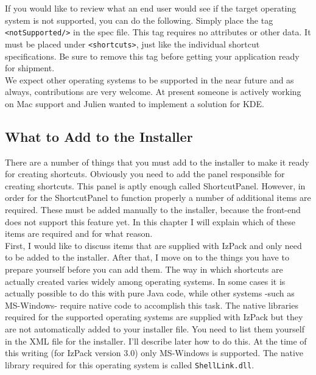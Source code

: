 If you would like to review what an end user would see if the target
operating system is not supported, you can do the following. Simply
place the tag \texttt{<notSupported/>} in the spec file. This tag requires no
attributes or other data. It must be placed under \texttt{<shortcuts>}, just like
the individual shortcut specifications. Be sure to remove this tag
before getting your application ready for shipment.\\

We expect other operating systems to be supported in the near future and
as always, contributions are very welcome. At present someone is
actively working on Mac support and  Julien wanted to implement a
solution for KDE.\\

\subsection{What to Add to the Installer}

There are a number of things that you must add to the installer to make
it ready for creating shortcuts. Obviously you need to add the panel
responsible for creating shortcuts. This panel is aptly enough called
ShortcutPanel. However, in order for the ShortcutPanel to function
properly a number of additional items are required. These must be added
manually to the installer, because the front-end does not support this
feature yet. In this chapter I will explain which of these items are
required and for what reason.\\

First, I would like to discuss items that are supplied with IzPack and
only need to be added to the installer. After that, I move on to the
things you have to prepare yourself before you can add them. The way in
which shortcuts are actually created varies widely among operating
systems. In some cases it is actually possible to do this with pure Java
code, while other systems -such as MS-Windows- require native code to
accomplish this task. The native libraries required for the supported
operating systems are supplied with IzPack but they are not
automatically added to your installer file. You need to list them
yourself in the XML file for the installer. I'll describe later how to
do this. At the time of this writing (for IzPack version 3.0) only
MS-Windows is supported. The native library required for this operating
system is called \texttt{ShellLink.dll}.\\

